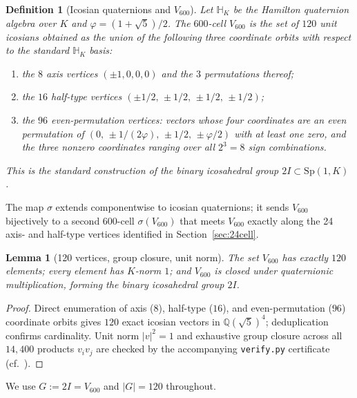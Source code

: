 \documentclass[11pt]{article}
\newtheorem{lemma}{Lemma}[section]
\newtheorem{definition}{Definition}[section]
\newcommand{\twoI}{2I}
\newcommand{\Vsixhundred}{V_{600}}
\newcommand{\sigmaG}{\sigma}
\begin{document}
\begin{definition}[Icosian quaternions and $\Vsixhundred$]\label{def:icosian}
Let $\mathbb{H}_K$ be the Hamilton quaternion algebra over $K$ and
$\varphi = (1+\sqrt{5})/2$. The \emph{$600$-cell} $\Vsixhundred$ is the
set of $120$ unit icosians obtained as the union of the following three
coordinate orbits with respect to the standard $\mathbb{H}_K$ basis:
\begin{enumerate}[label=(\roman*)]
\item the $8$ \emph{axis} vertices $(\pm 1, 0, 0, 0)$ and the $3$
permutations thereof;
\item the $16$ \emph{half-type} vertices $(\pm 1/2,\, \pm 1/2,\, \pm 1/2,\, \pm 1/2)$;
\item the $96$ \emph{even-permutation} vertices: vectors whose four
coordinates are an even permutation of
$(0,\, \pm 1/(2\varphi),\, \pm 1/2,\, \pm \varphi/2)$ with at least one
zero, and the three nonzero coordinates ranging over all $2^3 = 8$
sign combinations.
\end{enumerate}
This is the standard construction of the binary icosahedral group
$\twoI \subset \mathrm{Sp}(1, K)$ \citep{ConwaySloane1988,Coxeter1973,MoodyPatera1993}.
\end{definition}

The map $\sigmaG$ extends componentwise to icosian quaternions; it
sends $\Vsixhundred$ bijectively to a second 600-cell $\sigmaG(\Vsixhundred)$
that meets $\Vsixhundred$ exactly along the 24 axis- and half-type
vertices identified in Section~\ref{sec:24cell}.

\begin{lemma}[120 vertices, group closure, unit norm]\label{lem:basics}
The set $\Vsixhundred$ has exactly $120$ elements; every element has
$K$-norm $1$; and $\Vsixhundred$ is closed under quaternionic
multiplication, forming the binary icosahedral group $\twoI$.
\end{lemma}

\begin{proof}
Direct enumeration of axis ($8$), half-type ($16$), and even-permutation
($96$) coordinate orbits gives $120$ exact icosian vectors in
$\mathbb{Q}(\sqrt{5})^4$; deduplication confirms cardinality. Unit norm
$|v|^2 = 1$ and exhaustive group closure across all $14{,}400$ products
$v_i v_j$ are checked by the accompanying \texttt{verify.py} certificate
(cf.~\citealp{ConwaySloane1988}).
\end{proof}

We use $G := \twoI = \Vsixhundred$ and $|G| = 120$ throughout.
\end{document}
